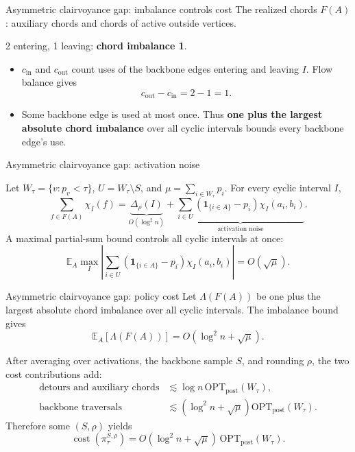 \documentclass[aspectratio=169,12pt]{beamer}
\newcommand{\OPT}{\mathrm{OPT}}
\newcommand{\optpost}{\OPT_{\mathrm{post}}}
\newcommand{\E}{\mathbb{E}}
\newcommand{\cost}{\operatorname{cost}}
\begin{document}
\begin{frame}{Asymmetric clairvoyance gap: imbalance controls cost}
  \small
  The realized chords \(F(A)\): auxiliary chords and chords of active outside vertices.

  {\centering
    \resizebox{0.88\linewidth}{!}{\ThImbalanceToMultiplicity}\par
    \textcolor{ThTeal}{2 entering}, \textcolor{ThCoral}{1 leaving}:
    \textbf{chord imbalance 1}.\par
  }

  \begin{itemize}\small\setlength{\itemsep}{0.65em}
    \item \(c_{\mathrm{in}}\) and \(c_{\mathrm{out}}\) count uses of the backbone edges
      entering and leaving \(I\). Flow balance gives
      \[
        c_{\mathrm{out}}-c_{\mathrm{in}}=2-1=1.
      \]
    \item Some backbone edge is used at most once. Thus
      \textbf{one plus the largest absolute chord imbalance} over all cyclic
      intervals bounds every backbone edge's use.
  \end{itemize}
\end{frame}

\begin{frame}{Asymmetric clairvoyance gap: activation noise}
  {\centering
    \resizebox{0.66\linewidth}{!}{\ThIntervalImbalance}\par
  }

  {\footnotesize\raggedright
    Let \(W_\tau=\{v:p_v<\tau\}\), \(U=W_\tau\setminus S\), and
    \(\mu=\sum_{i\in W_\tau}p_i\).
    For every cyclic interval \(I\),
    \[
      \sum_{f\in F(A)}\chi_I(f)
      =\underbrace{\Delta_\rho(I)}_{O(\log^2 n)}
      +\underbrace{\sum_{i\in U}
        (\mathbf 1_{\{i\in A\}}-p_i)\chi_I(a_i,b_i)}_{\text{activation noise}}.
    \]
    A maximal partial-sum bound controls all cyclic intervals at once:
    \[
      \E_A\max_I
        \left|\sum_{i\in U}(\mathbf 1_{\{i\in A\}}-p_i)
          \chi_I(a_i,b_i)\right|
      =O(\sqrt\mu).
    \]\par
  }
\end{frame}

\begin{frame}{Asymmetric clairvoyance gap: policy cost}
  \normalsize
  Let \(\Lambda(F(A))\) be one plus the largest absolute chord imbalance
  over all cyclic intervals. The imbalance bound gives
  \[
    \E_A[\Lambda(F(A))]=O(\log^2 n+\sqrt\mu).
  \]

  After averaging over activations, the backbone sample \(S\), and
  rounding \(\rho\), the two cost contributions add:
  \[
    \begin{aligned}
      \text{detours and auxiliary chords}
        &\lesssim \log n\,\optpost(W_\tau),\\
      \text{backbone traversals}
        &\lesssim (\log^2 n+\sqrt\mu)\optpost(W_\tau).
    \end{aligned}
  \]
  Therefore some \((S,\rho)\) yields
  \[
    \cost(\pi_\tau^{S,\rho})
    =O(\log^2 n+\sqrt\mu)\,\optpost(W_\tau).
  \]
\end{frame}
\end{document}
